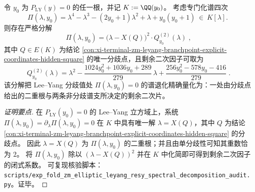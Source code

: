 \begin{conclusion}\label{con:xi-terminal-zm-leyang-branch-spectral-quartic-double-root-factorization}
令 \(y_0\) 为 \(P_{\mathrm{LY}}(y)=0\) 的任一根，并记 \(K:=\QQ(y_0)\)。
考虑专门化谱四次
\[
\Pi(\lambda,y_0)
=\lambda^{4}-\lambda^{3}-(2y_0+1)\lambda^{2}+\lambda+y_0(y_0+1)\ \in\ K[\lambda].
\]
则存在严格分解
\[
\boxed{\;
\Pi(\lambda,y_0)=\bigl(\lambda-X(Q)\bigr)^{2}\cdot Q_{y_0}^{(2)}(\lambda)\; },
\]
其中 \(Q\in E(K)\) 为结论 \ref{con:xi-terminal-zm-leyang-branchpoint-explicit-coordinates-hidden-square} 的唯一分歧点，且剩余二次因子可取为
\[
\boxed{\;
Q_{y_0}^{(2)}(\lambda)=\lambda^{2}
-\frac{1024y_0^{2}+1036y_0+289}{279}\,\lambda
+\frac{256y_0^{2}-578y_0-416}{279}\; }.
\]
该分解把 Lee--Yang 分歧值处 \(\Pi(\lambda,y_0)=0\) 的谱退化精确量化为：一处由分歧点给出的二重根与两条非分歧谱支所决定的剩余二次片。
\end{conclusion}
\begin{proof}[证明要点]
在 \(P_{\mathrm{LY}}(y_0)=0\) 的 Lee--Yang 立方域上，系统
\(
\Pi(\lambda,y_0)=\partial_{\lambda}\Pi(\lambda,y_0)=0
\)
在 \(K\) 中具有唯一解 \(\lambda=X(Q)\)，其中 \(Q\) 为结论 \ref{con:xi-terminal-zm-leyang-branchpoint-explicit-coordinates-hidden-square} 的分歧点。
因此 \(\lambda=X(Q)\) 为 \(\Pi(\lambda,y_0)\) 的二重根；并且由单分歧性可知其重数恰为 \(2\)。
将 \(\Pi(\lambda,y_0)\) 除以 \((\lambda-X(Q))^{2}\) 并在 \(K\) 中化简即可得到剩余二次因子的闭式系数。
可复现核验脚本：\texttt{scripts/exp\_fold\_zm\_elliptic\_leyang\_resy\_spectral\_decomposition\_audit.py}。证毕。
\end{proof}

